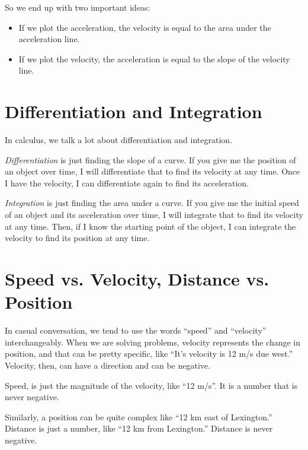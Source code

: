 So we end up with two important ideas:
\begin{itemize}
\item If we plot the acceleration, the velocity is equal to the area under the acceleration line.
\item If we plot the velocity, the acceleration is equal to the slope of the velocity line.
\end{itemize}

\section{Differentiation and Integration}

In calculus, we talk a lot about differentiation and integration.

\textit{Differentiation} is just finding the slope of a curve. If you give me
the position of an object over time, I will differentiate that to find
its velocity at any time. Once I have the velocity, I can differentiate
again to find its acceleration.

\textit{Integration} is just finding the area under a curve. If you give me
the initial speed of an object and its acceleration over time, I will
integrate that to find its velocity at any time. Then, if I know the
starting point of the object, I can integrate the velocity to find its
position at any time.

\section{Speed vs. Velocity, Distance vs. Position}

In casual conversation, we tend to use the words ``speed'' and
``velocity'' interchangeably. When we are solving problems, velocity
represents the change in position, and that can be pretty specific,
like ``It's velocity is 12 m/s due west.'' Velocity, then, can
have a direction and can be negative.

Speed, is just the magnitude of the velocity, like ``12 m/s''.  It is
a number that is never negative.

Similarly, a position can be quite complex like ``12 km east of
Lexington.'' Distance is just a number, like ``12 km from Lexington.''
Distance is never negative.



